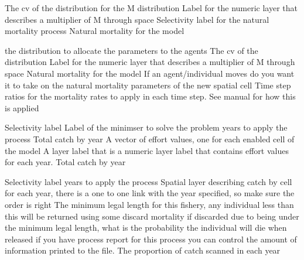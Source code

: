  {The cv of the distribution for the M distribution}
 {Label for the numeric layer that describes a multiplier of M through space}
 {Selectivity label for the natural mortality process}
 {Natural mortality for the model}
\par\textbf{}\par
{} {the distribution to allocate the parameters to the agents}
 {The cv of the distribution}
 {Label for the numeric layer that describes a multiplier of M through space}
 {Natural mortality for the model}
 {If an agent/individual moves do you want it to take on the natural mortality parameters of the new spatial cell}
 {Time step ratios for the mortality rates to apply in each time step. See manual for how this is applied}
\par\textbf{}\par
{} {Selectivity label}
 {Label of the minimser to solve the problem}
 {years to apply the process}
 {Total catch by year}
 {A vector of effort values, one for each enabled cell of the model}
 {A layer label that is a numeric layer label that contains effort values for each year.}
 {Total catch by year}
\par\textbf{}\par
{} {Selectivity label}
 {years to apply the process}
 {Spatial layer describing catch by cell for each year, there is a one to one link with the year specified, so make sure the order is right}
 {The minimum legal length for this fishery, any individual less than this will be returned using some discard mortality}
 {if discarded due to being under the minimum legal length, what is the probability the individual will die when released}
 {if you have process report for this process you can control the amount of information printed to the file.}
 {The proportion of catch scanned in each year}
\par\textbf{}\par

